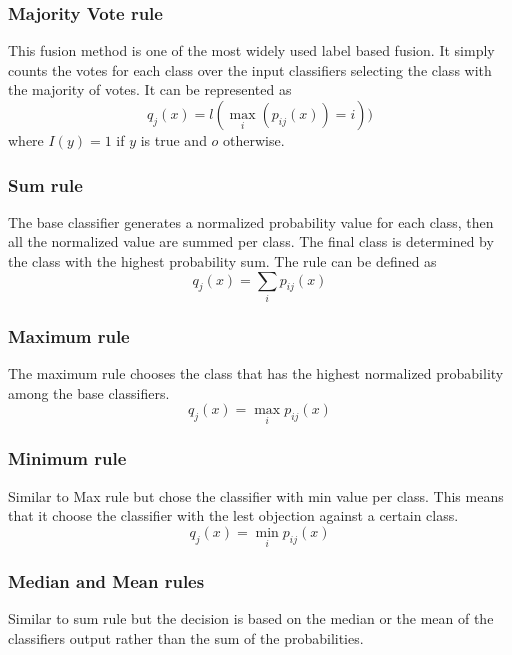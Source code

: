 \documentclass[conference]{IEEEtran}
\begin{document}
\subsubsection{Majority Vote rule}
This fusion method is one of the most widely  used label based fusion.  It simply counts the votes for each class over the input classifiers selecting the class with the majority of votes. It can be represented as %
\[
q_j(x)=l(\max\limits_i(p_{ij}(x))=i))
\]
where $I(y)=1$ if $y$ is true and $o$ otherwise.
\subsubsection{Sum rule}
 The base classifier generates a normalized probability value for each class, then all the normalized value are summed per class. The final class is determined by the class with the highest probability sum. The rule can be defined as
\[
q_j(x)=\sum\limits_i{p_{ij}(x)}
\]
\subsubsection{Maximum rule}
The maximum rule chooses the class that has the highest normalized probability among the base classifiers.%
\[
q_j(x)=\max\limits_i{p_{ij}(x)}
\]
\subsubsection{Minimum rule}
Similar to Max rule but chose the classifier with min value per class. This means that it choose the classifier with the lest objection against a certain class.%
\[
q_j(x)=\min\limits_i{p_{ij}(x)}
\]
\subsubsection{Median and Mean rules}
  Similar to sum rule but the decision is based on the median or the mean of the classifiers output rather than the sum of the probabilities.%
\end{document}
